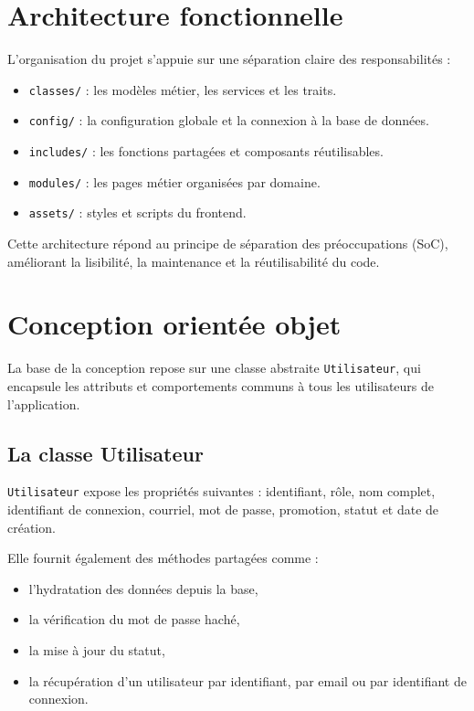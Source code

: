 \documentclass[12pt,a4paper]{article}
\begin{document}
\section{Architecture fonctionnelle}
L'organisation du projet s'appuie sur une séparation claire des responsabilités :
\begin{itemize}
  \item \texttt{classes/} : les modèles métier, les services et les traits.
  \item \texttt{config/} : la configuration globale et la connexion à la base de données.
  \item \texttt{includes/} : les fonctions partagées et composants réutilisables.
  \item \texttt{modules/} : les pages métier organisées par domaine.
  \item \texttt{assets/} : styles et scripts du frontend.
\end{itemize}

Cette architecture répond au principe de séparation des préoccupations (SoC), améliorant la lisibilité, la maintenance et la réutilisabilité du code.

\section{Conception orientée objet}
La base de la conception repose sur une classe abstraite \texttt{Utilisateur}, qui encapsule les attributs et comportements communs à tous les utilisateurs de l'application.

\subsection{La classe Utilisateur}
\texttt{Utilisateur} expose les propriétés suivantes : identifiant, rôle, nom complet, identifiant de connexion, courriel, mot de passe, promotion, statut et date de création.

Elle fournit également des méthodes partagées comme :
\begin{itemize}
  \item l'hydratation des données depuis la base,
  \item la vérification du mot de passe haché,
  \item la mise à jour du statut,
  \item la récupération d'un utilisateur par identifiant, par email ou par identifiant de connexion.
\end{itemize}
\end{document}
